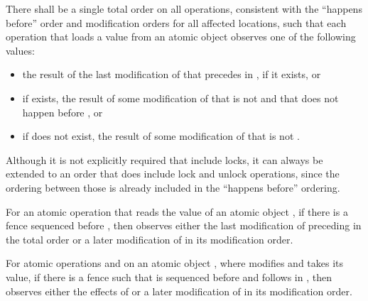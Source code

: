 \pnum
There shall be a single total order  on all 
operations, consistent with the ``happens before'' order and modification orders for all
affected locations, such that each  operation
 that loads a
value from an atomic object 
observes one of the following values:

\begin{itemize}
\item the result of the last modification  of  that precedes
 in , if it exists, or

\item if  exists, the result of some modification of 
that is not
 and that does not happen before , or

\item if  does not exist, the result of some modification of 
that is not
.
\end{itemize}

\begin{note} Although it is not explicitly required that  include locks, it can
always be extended to an order that does include lock and unlock operations, since the
ordering between those is already included in the ``happens before'' ordering. \end{note}

\pnum
For an atomic operation  that reads the value of an atomic object ,
if there is a  fence  sequenced before ,
then  observes either the last  modification of
 preceding  in the total order  or a later modification of
 in its modification order.

\pnum
For atomic operations  and  on an atomic object , where
 modifies  and  takes its value, if there is a
 fence  such that  is sequenced before
 and  follows  in , then  observes
either the effects of  or a later modification of  in its
modification order.

